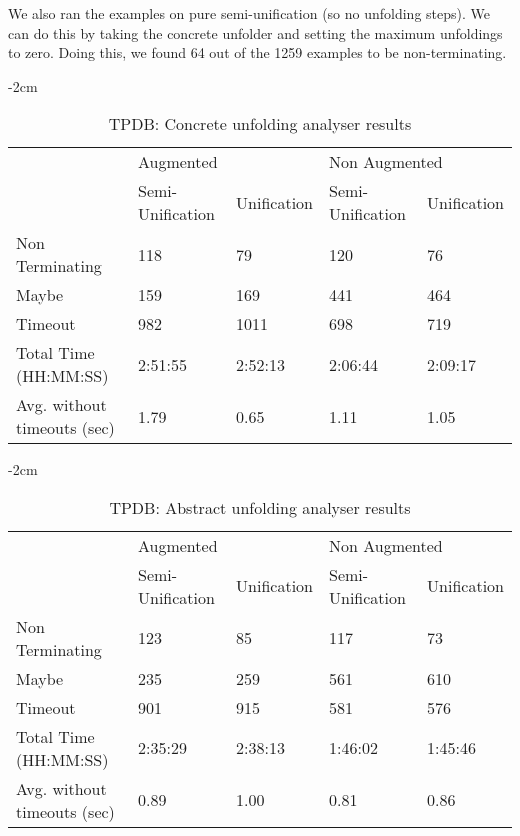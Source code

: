 We also ran the examples on pure semi-unification (so no unfolding steps). We can do this by taking the concrete unfolder and setting the maximum unfoldings to zero. Doing this, we found 64 out of the 1259 examples to be non-terminating. 
\begin{table}[ht]
    \centering
    \addtolength{\leftskip} {-2cm}
    \addtolength{\rightskip}{-2cm}

    \begin{tabular}{|l|l|l|l|l|}
    \cline{2-5} 
    \multicolumn{1}{c|}{} & \multicolumn{2}{l|}{Augmented} & \multicolumn{2}{l|}{Non Augmented} \\ \cline{2-5} 
    \multicolumn{1}{c|}{} & Semi-Unification & Unification & Semi-Unification & Unification \\ \hline
    Non Terminating & 118 & 79 & 120 & 76 \\ \hline
    Maybe & 159 & 169 & 441 & 464\\ \hline
    Timeout & 982 & 1011 & 698 & 719 \\ \hline
    Total Time (HH:MM:SS) & 2:51:55 & 2:52:13 & 2:06:44 & 2:09:17 \\ \hline
    Avg. without timeouts (sec) & 1.79 & 0.65 & 1.11 & 1.05 \\ \hline
    \end{tabular}
    \caption{TPDB: Concrete unfolding analyser results}
\label{tab:result:concrete}

\end{table}
\begin{table}[ht]
    \centering
    \addtolength{\leftskip} {-2cm}
    \addtolength{\rightskip}{-2cm}

    \begin{tabular}{|l|l|l|l|l|}
    \cline{2-5} 
    \multicolumn{1}{c|}{} & \multicolumn{2}{l|}{Augmented} & \multicolumn{2}{l|}{Non Augmented} \\ \cline{2-5} 
    \multicolumn{1}{c|}{} & Semi-Unification & Unification & Semi-Unification & Unification \\ \hline
    Non Terminating & 123 & 85 & 117 & 73 \\ \hline
    Maybe & 235 & 259 & 561 & 610 \\ \hline
    Timeout & 901 & 915 & 581 & 576 \\ \hline
    Total Time (HH:MM:SS) & 2:35:29 & 2:38:13 & 1:46:02 & 1:45:46 \\ \hline
    Avg. without timeouts (sec) & 0.89 & 1.00 & 0.81 & 0.86 \\ \hline
    \end{tabular}
    \caption{TPDB: Abstract unfolding analyser results}
    \label{tab:result:abstract}
\end{table}

